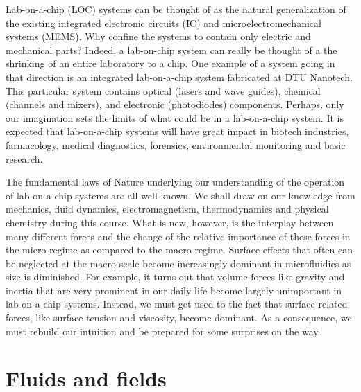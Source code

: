 Lab-on-a-chip (LOC) systems can be
thought of as the natural generalization of the existing
integrated electronic circuits (IC) and microelectromechanical
systems (MEMS).
 Why confine the systems to
contain only electric and mechanical parts? Indeed, a lab-on-chip
system can really be thought of a the shrinking of an entire
laboratory to a chip. One example of a system going in that
direction is an integrated lab-on-a-chip system fabricated at DTU Nanotech. This particular system contains optical (lasers and wave
guides), chemical (channels and mixers), and electronic
(photodiodes) components. Perhaps, only our imagination sets the
limits of what could be in a lab-on-a-chip system. It is expected
that lab-on-a-chip systems will have great impact in biotech
industries, farmacology, medical diagnostics, forensics,
environmental monitoring and basic research.

The fundamental laws of Nature underlying our understanding of the
operation of lab-on-a-chip systems are all well-known. We shall
draw on our knowledge from mechanics, fluid dynamics,
electromagnetism, thermodynamics and physical chemistry during
this course. What is new, however, is the interplay between many
different forces and the change of the relative importance of
these forces in the micro-regime as compared to the macro-regime.
Surface effects that often can be neglected at the macro-scale
become increasingly dominant in microfluidics as size is
diminished. For example, it turns out that volume forces like
gravity and inertia that are very prominent in our daily life
become largely unimportant in lab-on-a-chip systems. Instead, we
must get used to the fact that surface related forces, like
surface tension and viscosity, become dominant. As a consequence,
we must rebuild our intuition and be prepared for some surprises
on the way.




\section{Fluids and fields}

